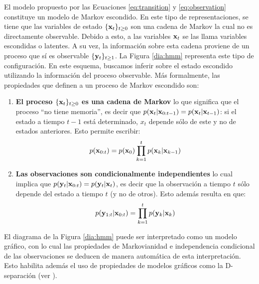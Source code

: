 El modelo propuesto por las Ecuaciones \ref{eq:transition} y \ref{eq:observation} constituye un modelo de Markov escondido. En este tipo de representaciones, se tiene que las variables de estado $\{\mathbf{x}_t\}_{t \ge 0}$ son una cadena de Markov la cual no es directamente observable. Debido a esto, a las variables $\mathbf{x}_t$ se las llama variables escondidas o latentes. A su vez, la información sobre esta cadena proviene de un proceso que sí es observable $\{\mathbf{y}_t\}_{t \ge 1}$. La Figura \ref{dia:hmm} representa este tipo de configuración. En este esquema, buscamos inferir sobre el estado escondido utilizando la información del proceso observable. Más formalmente, las propiedades que definen a un proceso de Markov escondido son: 
\begin{enumerate}
    \item \textbf{El proceso $\{\mathbf{x}_t\}_{t \ge 0}$ es una cadena de Markov} lo que significa que el proceso ``no tiene memoria'', es decir que $p(\mathbf{x}_t | \mathbf{x}_{0:t-1}) = p(\mathbf{x}_t | \mathbf{x}_{t-1})$: si el estado a tiempo $t-1$ está determinado, $x_t$ depende sólo de este y no de estados anteriores. Esto permite escribir:
    \begin{align*}
        p(\mathbf{x}_{0:t}) = p(\mathbf{x}_0) \prod_{k=1}^{t} p(\mathbf{x}_k | \mathbf{x}_{k-1})
    \end{align*}
    \item \textbf{Las observaciones son condicionalmente independientes}  lo cual implica que $p(\mathbf{y}_t | \mathbf{x}_{0:t}) = p(\mathbf{y}_t | \mathbf{x}_t)$, es decir que la observación a tiempo $t$ sólo depende del estado a tiempo $t$ (y no de otros). Esto además resulta en que:
    \begin{align*}
        p(\mathbf{y}_{1:t} | \mathbf{x}_{0:t}) = \prod_{k=1}^{t} p(\mathbf{y}_k | \mathbf{x}_k)
    \end{align*}
\end{enumerate}
El diagrama de la Figura \ref{dia:hmm} puede ser interpretado como un modelo gráfico, con lo cual las propiedades de Markovianidad e independencia condicional de las observaciones se deducen de manera automática de esta interpretación. Esto habilita además el uso de propiedades de modelos gráficos como la D-separación (ver \cite{Jordan1999}).

